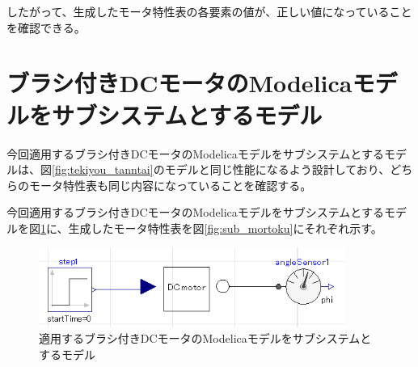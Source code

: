 したがって、生成したモータ特性表の各要素の値が、正しい値になっていることを確認できる。

\section{ブラシ付きDCモータのModelicaモデルをサブシステムとするモデル}
今回適用するブラシ付きDCモータのModelicaモデルをサブシステムとするモデルは、図\ref{fig:tekiyou_tanntai}のモデルと同じ性能になるよう設計しており、どちらのモータ特性表も同じ内容になっていることを確認する。

今回適用するブラシ付きDCモータのModelicaモデルをサブシステムとするモデルを図\ref{fig:tekiyou_sub}に、生成したモータ特性表を図\ref{fig:sub_mortoku}にそれぞれ示す。

\begin{figure}[t]
	\centering
	\includegraphics[width=10cm]{./Image/tekiyou_sub.png}
	\caption{適用するブラシ付きDCモータのModelicaモデルをサブシステムとするモデル}
	\label{fig:tekiyou_sub}
\end{figure}

